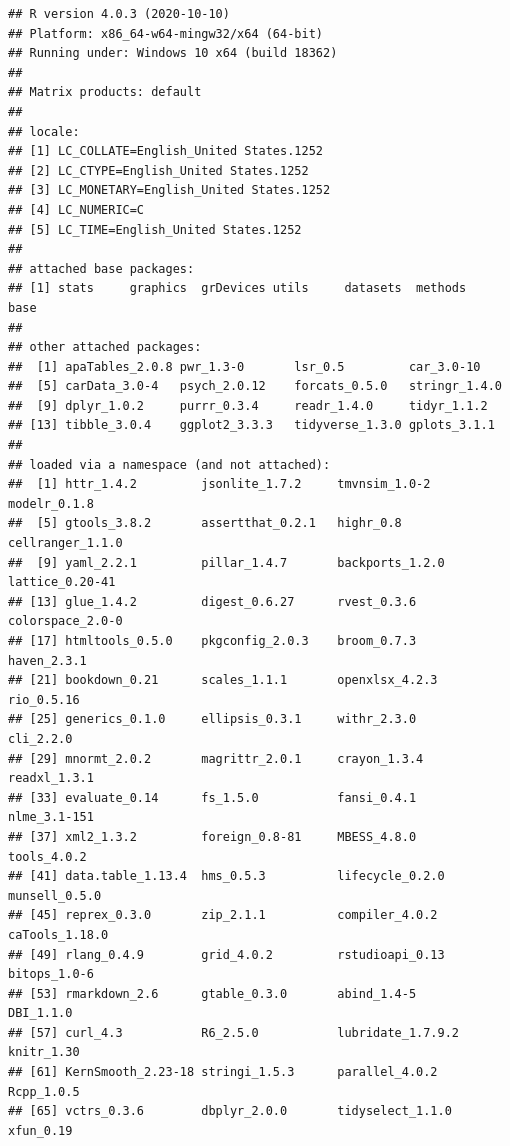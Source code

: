 \documentclass[
  english,
]{book}
\begin{document}
\begin{verbatim}
## R version 4.0.3 (2020-10-10)
## Platform: x86_64-w64-mingw32/x64 (64-bit)
## Running under: Windows 10 x64 (build 18362)
## 
## Matrix products: default
## 
## locale:
## [1] LC_COLLATE=English_United States.1252 
## [2] LC_CTYPE=English_United States.1252   
## [3] LC_MONETARY=English_United States.1252
## [4] LC_NUMERIC=C                          
## [5] LC_TIME=English_United States.1252    
## 
## attached base packages:
## [1] stats     graphics  grDevices utils     datasets  methods   base     
## 
## other attached packages:
##  [1] apaTables_2.0.8 pwr_1.3-0       lsr_0.5         car_3.0-10     
##  [5] carData_3.0-4   psych_2.0.12    forcats_0.5.0   stringr_1.4.0  
##  [9] dplyr_1.0.2     purrr_0.3.4     readr_1.4.0     tidyr_1.1.2    
## [13] tibble_3.0.4    ggplot2_3.3.3   tidyverse_1.3.0 gplots_3.1.1   
## 
## loaded via a namespace (and not attached):
##  [1] httr_1.4.2         jsonlite_1.7.2     tmvnsim_1.0-2      modelr_0.1.8      
##  [5] gtools_3.8.2       assertthat_0.2.1   highr_0.8          cellranger_1.1.0  
##  [9] yaml_2.2.1         pillar_1.4.7       backports_1.2.0    lattice_0.20-41   
## [13] glue_1.4.2         digest_0.6.27      rvest_0.3.6        colorspace_2.0-0  
## [17] htmltools_0.5.0    pkgconfig_2.0.3    broom_0.7.3        haven_2.3.1       
## [21] bookdown_0.21      scales_1.1.1       openxlsx_4.2.3     rio_0.5.16        
## [25] generics_0.1.0     ellipsis_0.3.1     withr_2.3.0        cli_2.2.0         
## [29] mnormt_2.0.2       magrittr_2.0.1     crayon_1.3.4       readxl_1.3.1      
## [33] evaluate_0.14      fs_1.5.0           fansi_0.4.1        nlme_3.1-151      
## [37] xml2_1.3.2         foreign_0.8-81     MBESS_4.8.0        tools_4.0.2       
## [41] data.table_1.13.4  hms_0.5.3          lifecycle_0.2.0    munsell_0.5.0     
## [45] reprex_0.3.0       zip_2.1.1          compiler_4.0.2     caTools_1.18.0    
## [49] rlang_0.4.9        grid_4.0.2         rstudioapi_0.13    bitops_1.0-6      
## [53] rmarkdown_2.6      gtable_0.3.0       abind_1.4-5        DBI_1.1.0         
## [57] curl_4.3           R6_2.5.0           lubridate_1.7.9.2  knitr_1.30        
## [61] KernSmooth_2.23-18 stringi_1.5.3      parallel_4.0.2     Rcpp_1.0.5        
## [65] vctrs_0.3.6        dbplyr_2.0.0       tidyselect_1.1.0   xfun_0.19
\end{verbatim}

  
\end{document}
